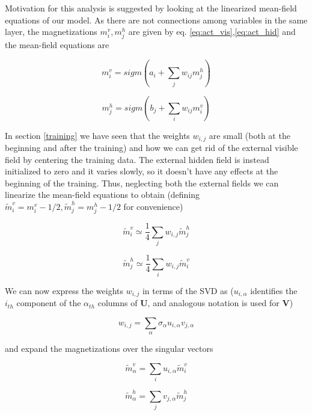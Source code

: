 \documentclass{revtex4-1}
\begin{document}
Motivation for this analysis is suggested by looking at the linearized mean-field equations of our model. As there are not connections among variables in the same layer, the magnetizations \(m_i^v,m_j^h\) are given by eq. \eqref{eq:act_vis},\eqref{eq:act_hid} and the mean-field equations are

\begin{equation}
m_i^v = sigm \left(a_i + \sum_{j} w_{ij} m_j^h \right)
\end{equation}

\begin{equation}
m_j^h = sigm \left(b_j + \sum_i w_{ij} m^v_i \right)
\end{equation}

In section \ref{training} we have seen that the weights \(w_{i,j}\) are small (both at the beginning and after the training) and how we can get rid of the external visible field by centering the training data. The external hidden field is instead initialized to zero and it varies slowly, so it doesn't have any effects at the beginning of the training. Thus, neglecting both the external fields we can linearize the mean-field equations to obtain (defining \( \tilde{m}_i^v = m_i^v - 1/2, \tilde{m}_j^h = m_j^h - 1/2 \) for convenience)

\begin{equation}
\tilde{m}_i^v \simeq \frac{1}{4} \sum_j w_{i,j} \tilde{m}_j^h
\label{eq:mf_vis}
\end{equation}

\begin{equation}
\tilde{m}_j^h \simeq \frac{1}{4} \sum_i w_{i,j} \tilde{m}_i^v
\end{equation}

We can now express the weights \(w_{i,j}\) in terms of the SVD as (\(u_{i,\alpha}\) identifies the \(i_{th}\) component of the \(\alpha_{th}\) columns of \(\mathbf{U}\), and analogous notation is used for \(\mathbf{V}\))

\begin{equation}
w_{i,j} = \sum_{\alpha} \sigma_{\alpha} u_{i,\alpha} v_{j,\alpha}
\label{eq:w_exp}
\end{equation}

and expand the magnetizations over the singular vectors

\begin{equation}
\tilde{m}_{\alpha}^v = \sum_i u_{i,\alpha} \tilde{m}_i^v
\label{eq:mv_exp}
\end{equation}

\begin{equation}
\tilde{m}_{\alpha}^h = \sum_j v_{j,\alpha} \tilde{m}_j^h
\end{equation}
\end{document}
